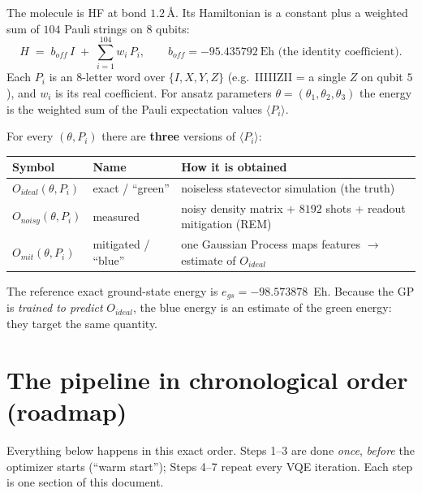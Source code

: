 \documentclass[11pt]{article}
\def\bm#1{#1}%
\def\texttt#1{#1}%
\def\mathrm#1{#1}%
\newcommand{\egs}{e_{\mathrm{gs}}}
\newcommand{\boff}{b_{\mathrm{off}}}
\begin{document}
The molecule is HF at bond $1.2$\,\AA. Its Hamiltonian is a constant plus a
weighted sum of $104$ Pauli strings on $8$ qubits:
\begin{equation}
H \;=\; \boff\,I \;+\; \sum_{i=1}^{104} w_i\, P_i ,
\qquad \boff = -95.435792~\text{Eh (the identity coefficient).}
\label{eq:H}
\end{equation}
Each $P_i$ is an $8$-letter word over $\{I,X,Y,Z\}$ (e.g.\ \texttt{IIIIIZII} = a
single $Z$ on qubit $5$), and $w_i$ is its real coefficient. For ansatz
parameters $\bm\theta=(\theta_1,\theta_2,\theta_3)$ the energy is the weighted
sum of the Pauli expectation values $\langle P_i\rangle$.

For every $(\bm\theta,P_i)$ there are \textbf{three} versions of $\langle P_i\rangle$:

\begin{center}
\renewcommand{\arraystretch}{1.2}
\begin{tabular}{@{}lll@{}}
\toprule
Symbol & Name & How it is obtained \\
\midrule
$O_{\mathrm{ideal}}(\bm\theta,P_i)$ & exact / ``green'' & noiseless statevector simulation (the truth) \\
$O_{\mathrm{noisy}}(\bm\theta,P_i)$ & measured & noisy density matrix + $8192$ shots + readout mitigation (REM) \\
$O_{\mathrm{mit}}(\bm\theta,P_i)$ & mitigated / ``blue'' & one Gaussian Process maps features $\to$ estimate of $O_{\mathrm{ideal}}$ \\
\bottomrule
\end{tabular}
\end{center}

\noindent
The reference exact ground-state energy is $\egs=-98.573878$~Eh. Because the GP
is \emph{trained to predict} $O_{\mathrm{ideal}}$, the blue energy is an estimate
of the green energy: they target the same quantity.

\section{The pipeline in chronological order (roadmap)}
\label{sec:roadmap}

Everything below happens in this exact order. Steps 1--3 are done \emph{once},
\emph{before} the optimizer starts (``warm start''); Steps 4--7 repeat every VQE
iteration. Each step is one section of this document.
\end{document}
